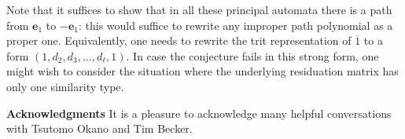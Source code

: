 \documentclass[12pt]{svmult}
\def\trtm{\overline{1}}
\def\trtp{1}
\def\unvo{\mathbf{e}_{1}}
\begin{document}
Note that it suffices to show that in all these principal automata there is a path 
from $\unvo$ to $-\unvo$: this would suffice to rewrite any improper path polynomial 
as a proper one.
Equivalently, one needs to rewrite the trit representation of $\trtm$  to a form 
$(\trtp,d_2,d_3,\ldots,d_{\ell},\trtp)$.
In case the conjecture fails in this strong form, one might wish to consider the 
situation where the underlying residuation matrix has only one similarity type. 
\vspace{2ex} 

\textbf{Acknowledgments}
It is a pleasure to acknowledge many helpful conversations with Tsutomo Okano 
and Tim Becker. 




% 
% 
\end{document}
